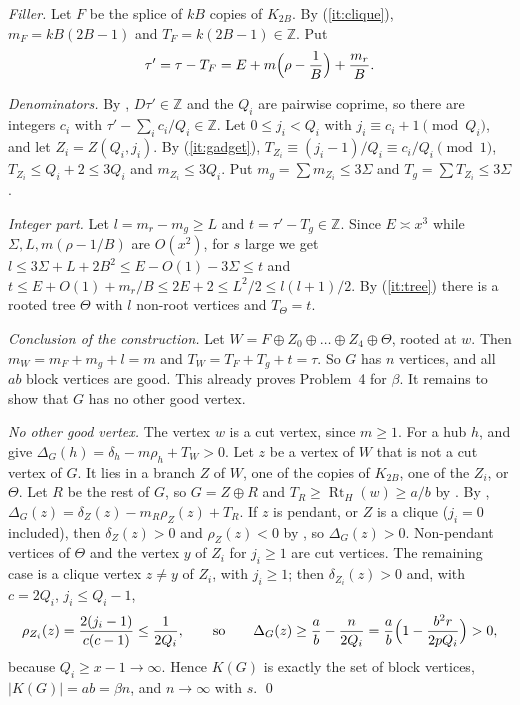 \documentclass[11pt,a4paper]{report}
\newcommand*{\Rt}{\operatorname{Rt}}
\begin{document}
\emph{Filler.} Let \(F\) be the splice of \(kB\) copies of \(K_{2B}\). By (\ref{it:clique}),
\(m_F=kB(2B-1)\) and \(T_F=k(2B-1)\in\mathbb Z\). Put
\[\tau'=\tau-T_F=E+m\Bigl(\rho-\frac1B\Bigr)+\frac{m_r}B.\]

\emph{Denominators.} By , \(D\tau'\in\mathbb Z\) and the \(Q_i\) are pairwise coprime, so there are integers
\(c_i\) with \(\tau'-\sum_ic_i/Q_i\in\mathbb Z\). Let \(0\le j_i<Q_i\) with \(j_i\equiv c_i+1\pmod{Q_i}\), and let
\(Z_i=Z(Q_i,j_i)\). By (\ref{it:gadget}), \(T_{Z_i}\equiv(j_i-1)/Q_i\equiv c_i/Q_i\pmod1\),
\(T_{Z_i}\le Q_i+2\le3Q_i\) and \(m_{Z_i}\le3Q_i\). Put \(m_g=\sum m_{Z_i}\le3\Sigma\) and \(T_g=\sum T_{Z_i}\le3\Sigma\).

\emph{Integer part.} Let \(l=m_r-m_g\ge L\) and \(t=\tau'-T_g\in\mathbb Z\). Since \(E\asymp x^3\) while
\(\Sigma,L,m(\rho-1/B)\) are \(O(x^2)\), for \(s\) large we get
\(l\le3\Sigma+L+2B^2\le E-O(1)-3\Sigma\le t\) and \(t\le E+O(1)+m_r/B\le2E+2\le L^2/2\le l(l+1)/2\). By
(\ref{it:tree}) there is a rooted tree \(\Theta\) with \(l\) non-root vertices and \(T_\Theta=t\).

\emph{Conclusion of the construction.} Let \(W=F\oplus Z_0\oplus\dots\oplus Z_4\oplus\Theta\), rooted at \(w\). Then
\(m_W=m_F+m_g+l=m\) and \(T_W=T_F+T_g+t=\tau\). So \(G\) has \(n\) vertices, and all \(ab\) block vertices are good. This
already proves Problem~4 for \(\beta\). It remains to show that \(G\) has no other good vertex.

\emph{No other good vertex.} The vertex \(w\) is a cut vertex, since \(m\ge1\). For a hub \(h\),  and
 give \(\Delta_G(h)=\delta_h-m\rho_h+T_W>0\). Let \(z\) be a vertex of \(W\) that is not a cut vertex of \(G\). It
lies in a branch \(Z\) of \(W\), one of the copies of \(K_{2B}\), one of the \(Z_i\), or \(\Theta\). Let \(R\) be the rest of \(G\), so
\(G=Z\oplus R\) and \(T_R\ge\Rt_H(w)\ge a/b\) by . By ,
\(\Delta_G(z)=\delta_Z(z)-m_R\rho_Z(z)+T_R\). If \(z\) is pendant, or \(Z\) is a clique (\(j_i=0\) included), then \(\delta_Z(z)>0\) and
\(\rho_Z(z)<0\) by , so \(\Delta_G(z)>0\). Non-pendant vertices of \(\Theta\) and the vertex \(y\) of \(Z_i\) for
\(j_i\ge1\) are cut vertices. The remaining case is a clique vertex \(z\ne y\) of \(Z_i\), with \(j_i\ge1\); then
\(\delta_{Z_i}(z)>0\) and, with \(c=2Q_i\), \(j_i\le Q_i-1\),
\[\rho_{Z_i}(z)=\frac{2(j_i-1)}{c(c-1)}\le\frac1{2Q_i},\qquad\text{so}\qquad
\Delta_G(z)\ge\frac ab-\frac n{2Q_i}=\frac ab\Bigl(1-\frac{b^2r}{2pQ_i}\Bigr)>0,\]
because \(Q_i\ge x-1\to\infty\). Hence \(K(G)\) is exactly the set of block vertices, \(|K(G)|=ab=\beta n\), and \(n\to\infty\)
with \(s\). \qed
\end{document}

